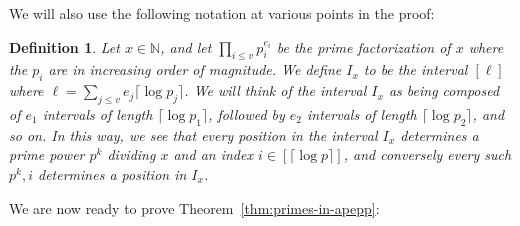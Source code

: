 \documentclass[11pt]{article}
\newtheorem{definition}{Definition}
\begin{document}
We will also use the following notation at various points in the proof:
\begin{definition}
Let $x \in \mathbb{N}$, and let $\prod\limits_{i \leq v} p_i^{e_i}$ be the prime factorization of $x$ where the $p_i$ are in increasing order of magnitude. We define $I_x$ to be the interval $[\ell]$ where $\ell = \sum\limits_{j \leq v} e_j \lceil \log p_j \rceil$. We will think of the interval $I_x$ as being composed of $e_1$ intervals of length $\lceil \log p_1\rceil$, followed by $e_2$ intervals of length $\lceil \log p_2\rceil$, and so on. In this way, we see that every position in the interval $I_x$ determines a prime power $p^k$ dividing $x$ and an index $i \in [\lceil \log p \rceil]$, and conversely every such $p^k,i$ determines a position in $I_x$.
\end{definition}
We are now ready to prove Theorem~\ref{thm:primes-in-apepp}:
\end{document}
